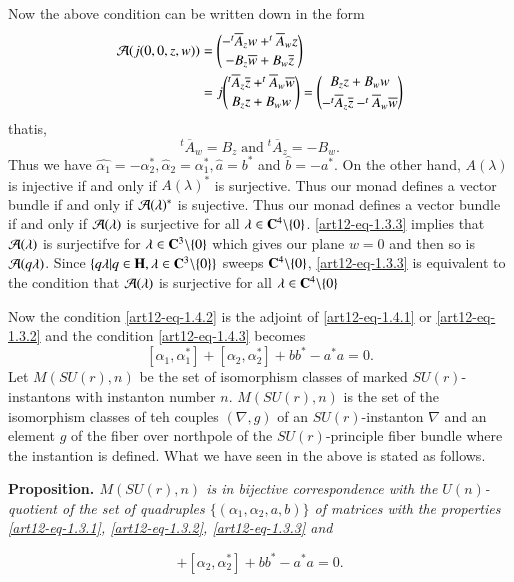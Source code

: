 Now the above condition can be written down in the form
\begin{align*}
\mathcal{A}(j(0,0,z,w)) &= \binom{-^{t}\overline{A}_{z}w +^{t}\overline{A}_{w}z}{-B_{z}\overline{w}+B_{w}\overline{z}}\\
 &= j \binom{^{t}\overline{A}_{z}\overline{z} +^{t}\overline{A}_{w}\overline{w}}{B_{z}z+B_{w}w} = \binom{B_{z}z+B_{w}w}{-^{t}\overline{A}_{z}\overline{z}-^{t}\overline{A}_{w}\overline{w}}\\
\end{align*}
that\pageoriginale is,
$$
^{t}\overline{A}_{w} = B_{z}\; \text{and} \; ^{t}\overline{A}_{z}= -B_{w}. 
$$
Thus we have $\hat{\alpha_{1}} = -\alpha_{2}^{*}, \hat{\alpha}_{2} = \alpha_{1}^{*}, \hat{a}=b^{*}$ and $\hat{b} = -a^{*}$. On the other hand, $A(\lambda)$ is injective if and only if $A(\lambda)^{*}$ is surjective. Thus our monad defines a vector bundle if and only if $\mathcal{A}(\lambda)^{*}$ is sujective. Thus our monad defines a vector bundle if and  only if $\mathcal{A}(\lambda)$ is surjective for all $\lambda \in \mathbf{C}^{4}\backslash \{0\}$. \eqref{art12-eq-1.3.3} implies that $\mathcal{A}(\lambda)$ is surjectifve for $\lambda \in \mathbf{C}^{3}\backslash\{0\}$ which gives our plane $w=0$ and then so is $\mathcal{A}(q \lambda)$. Since $\{q \lambda | q \in \mathbf{H}, \lambda \in \mathbf{C}^{3} \backslash\{0\}\}$ sweeps $\mathbf{C}^{4} \backslash \{0\}$, \eqref{art12-eq-1.3.3} is equivalent to the condition that $\mathcal{A}(\lambda)$ is surjective for all $\lambda \in \mathbf{C}^{4}\backslash\{0\}$ 

Now the condition \eqref{art12-eq-1.4.2} is the adjoint of \eqref{art12-eq-1.4.1} or \eqref{art12-eq-1.3.2} and the condition \eqref{art12-eq-1.4.3} becomes
$$
[\alpha_{1}, \alpha_{1}^{*}] + [\alpha_{2}, \alpha_{2}^{*}] + bb^{*}-a^{*}a=0.
$$
 Let $M(SU(r), n)$ be the set of isomorphism classes of marked $SU(r)$-instantons with instanton number $n$. $M(SU(r), n)$ is the set of the isomorphism classes of teh couples $(\nabla, g)$ of an $SU(r)$-instanton $\nabla$ and an element $g$ of the fiber over northpole of the $SU(r)$-principle fiber bundle where the instantion is defined. What we have seen in the above is stated as follows.
  
\medskip
\noindent
{\bfseries {} Proposition. \label{art12-prop-1.6}}\textit{$M(SU(r),n)$ is in bijective correspondence with the $U(n)$-quotient of the set of quadruples $\{(\alpha_{1}, \alpha_{2},a,b)\}$ of matrices with the properties
\eqref{art12-eq-1.3.1}, \eqref{art12-eq-1.3.2}, \eqref{art12-eq-1.3.3} and}

\begin{equation}
[\alpha_{1}, \alpha_{1}^{*}] + [\alpha_{2}, \alpha_{2}^{*}] + bb^{*}-a^{*}a=0.\tag{1.6.1}\label{art12-eq-1.6.1}
\end{equation}

